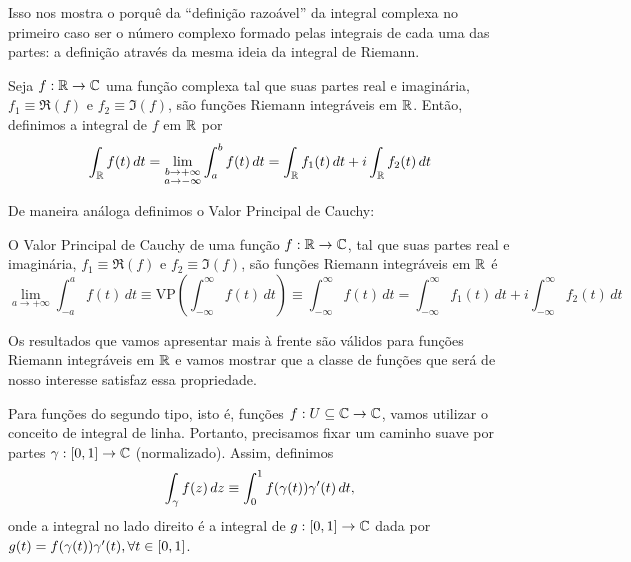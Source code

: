         Isso nos mostra o porquê da ``definição razoável'' da integral complexa no primeiro caso
        ser o número complexo formado pelas integrais de cada uma das partes: a definição através
        da mesma ideia da integral de Riemann.
        \begin{definicao}
        \label{def-integral-complexa-impropria-tipo-1}
            Seja $f:\mathbb{R}\to\mathbb{C}$ uma função complexa tal que suas partes real e imaginária,
            $f_1\equiv\Re(f)$ e $f_2\equiv\Im(f)$, são funções Riemann integráveis em $\mathbb{R}$.
            Então, definimos a integral de $f$ em $\mathbb{R}$ por
            \begin{equation*}
                \int_{\mathbb{R}} f(t) \, dt=\lim_{\substack{b\to +\infty \\ a\to -\infty}}\int_a^b f(t) \, dt
                                    = \int_{\mathbb{R}} f_1(t) \, dt + i\int_{\mathbb{R}} f_2(t) \, dt
            \end{equation*}
        \end{definicao}
        De maneira análoga definimos o Valor Principal de Cauchy:
        \begin{definicao}
        \label{def-valor-principal-integral-complexa-tipo-1}
            O Valor Principal de Cauchy de uma função $f:\mathbb{R}\to\mathbb{C}$, tal que suas partes 
            real e imaginária, $f_1\equiv\Re(f)$ e $f_2\equiv\Im(f)$, são funções Riemann 
            integráveis em $\mathbb{R}$ é
            \begin{equation*}
                \lim_{a\to +\infty} \int_{-a}^a f(t) \, dt
                \equiv \text{VP}\left( \int_{-\infty}^{\infty} f(t) \, dt \right)
                \equiv \int_{-\infty}^{\infty} f(t) \, dt
                = \int_{-\infty}^{\infty} f_1(t) \, dt + i\int_{-\infty}^{\infty} f_2(t) \, dt
            \end{equation*}
        \end{definicao}
        Os resultados que vamos apresentar mais à frente são válidos para funções Riemann
        integráveis em $\mathbb{R}$ e vamos mostrar que a classe de funções que será de nosso interesse
        satisfaz essa propriedade.
        
        Para funções do segundo tipo, isto é, funções $f:U\subseteq\mathbb{C}\to\mathbb{C}$, vamos utilizar o
        conceito de integral de linha. Portanto, precisamos fixar um caminho suave por partes
        $\gamma:[0,1]\to\mathbb{C}$ (normalizado). Assim, definimos
        \begin{equation}
        \label{def-integral-complexa-tipo-2}
            \int_{\gamma} f(z) \, dz \equiv \int_0^1 f(\gamma(t))\gamma'(t) \, dt,
        \end{equation}
        onde a integral no lado direito é a integral de $g:[0,1]\to\mathbb{C}$ dada por 
        $g(t) = f(\gamma(t))\gamma'(t), \forall t\in [0,1]$.
        
